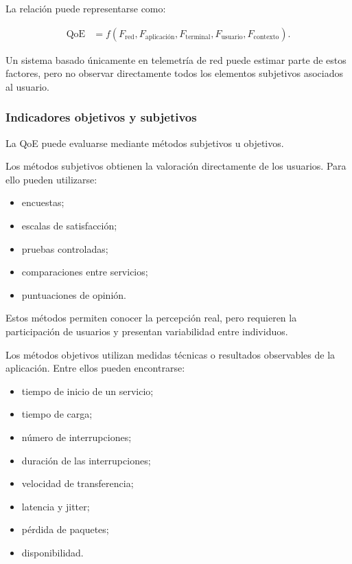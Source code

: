 La relación puede representarse como:

\[
\begin{aligned}
    \mathrm{QoE}
    &=
    f
    \left(
        F_{\mathrm{red}},
        F_{\mathrm{aplicación}},
        F_{\mathrm{terminal}},
        F_{\mathrm{usuario}},
        F_{\mathrm{contexto}}
    \right).
\end{aligned}
\]

Un sistema basado únicamente en telemetría de red puede estimar parte de
estos factores, pero no observar directamente todos los elementos
subjetivos asociados al usuario.


\subsubsection*{Indicadores objetivos y subjetivos}

La QoE puede evaluarse mediante métodos subjetivos u objetivos.

Los métodos subjetivos obtienen la valoración directamente de los
usuarios. Para ello pueden utilizarse:

\begin{itemize}
    \item encuestas;

    \item escalas de satisfacción;

    \item pruebas controladas;

    \item comparaciones entre servicios;

    \item puntuaciones de opinión.
\end{itemize}

Estos métodos permiten conocer la percepción real, pero requieren la
participación de usuarios y presentan variabilidad entre individuos.

Los métodos objetivos utilizan medidas técnicas o resultados observables
de la aplicación. Entre ellos pueden encontrarse:

\begin{itemize}
    \item tiempo de inicio de un servicio;

    \item tiempo de carga;

    \item número de interrupciones;

    \item duración de las interrupciones;

    \item velocidad de transferencia;

    \item latencia y jitter;

    \item pérdida de paquetes;

    \item disponibilidad.
\end{itemize}

